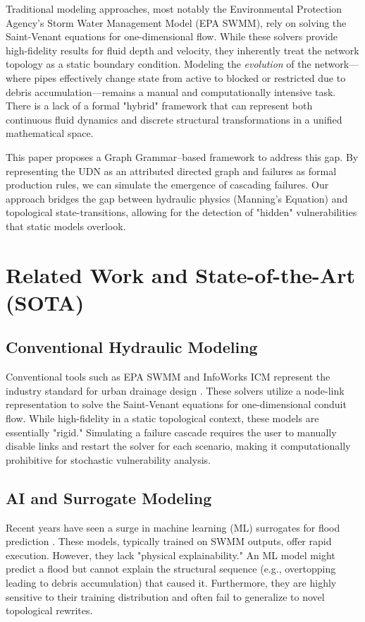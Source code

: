 \documentclass[conference]{IEEEtran}
\begin{document}
Traditional modeling approaches, most notably the Environmental Protection Agency's Storm Water Management Model (EPA SWMM), rely on solving the Saint-Venant equations for one-dimensional flow. While these solvers provide high-fidelity results for fluid depth and velocity, they inherently treat the network topology as a static boundary condition. Modeling the \textit{evolution} of the network—where pipes effectively change state from active to blocked or restricted due to debris accumulation—remains a manual and computationally intensive task. There is a lack of a formal "hybrid" framework that can represent both continuous fluid dynamics and discrete structural transformations in a unified mathematical space.

This paper proposes a Graph Grammar--based framework to address this gap. By representing the UDN as an attributed directed graph and failures as formal production rules, we can simulate the emergence of cascading failures. Our approach bridges the gap between hydraulic physics (Manning's Equation) and topological state-transitions, allowing for the detection of "hidden" vulnerabilities that static models overlook.

\section{Related Work and State-of-the-Art (SOTA)}
\subsection{Conventional Hydraulic Modeling}
Conventional tools such as EPA SWMM and InfoWorks ICM represent the industry standard for urban drainage design \cite{b8}. These solvers utilize a node-link representation to solve the Saint-Venant equations for one-dimensional conduit flow. While high-fidelity in a static topological context, these models are essentially "rigid." Simulating a failure cascade requires the user to manually disable links and restart the solver for each scenario, making it computationally prohibitive for stochastic vulnerability analysis.

\subsection{AI and Surrogate Modeling}
Recent years have seen a surge in machine learning (ML) surrogates for flood prediction \cite{b9}. These models, typically trained on SWMM outputs, offer rapid execution. However, they lack "physical explainability." An ML model might predict a flood but cannot explain the structural sequence (e.g., overtopping leading to debris accumulation) that caused it. Furthermore, they are highly sensitive to their training distribution and often fail to generalize to novel topological rewrites.
\end{document}
